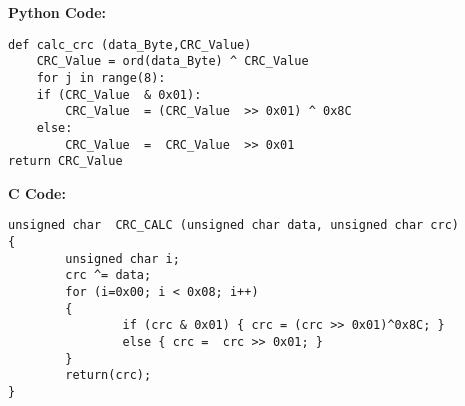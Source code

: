 \textbf{Python Code:}
\begin{mdframed}
\begin{lstlisting}
def calc_crc (data_Byte,CRC_Value)
    CRC_Value = ord(data_Byte) ^ CRC_Value
    for j in range(8):
    if (CRC_Value  & 0x01):
        CRC_Value  = (CRC_Value  >> 0x01) ^ 0x8C
    else:
        CRC_Value  =  CRC_Value  >> 0x01
return CRC_Value
\end{lstlisting}
\end{mdframed}

\vskip 0.1in
\textbf{C Code:}
\begin{mdframed}
\begin{lstlisting}
unsigned char  CRC_CALC (unsigned char data, unsigned char crc) 
{ 
        unsigned char i;
        crc ^= data;
        for (i=0x00; i < 0x08; i++)
        {
                if (crc & 0x01) { crc = (crc >> 0x01)^0x8C; }
                else { crc =  crc >> 0x01; }
        }
        return(crc);
}
\end{lstlisting}
\end{mdframed}
